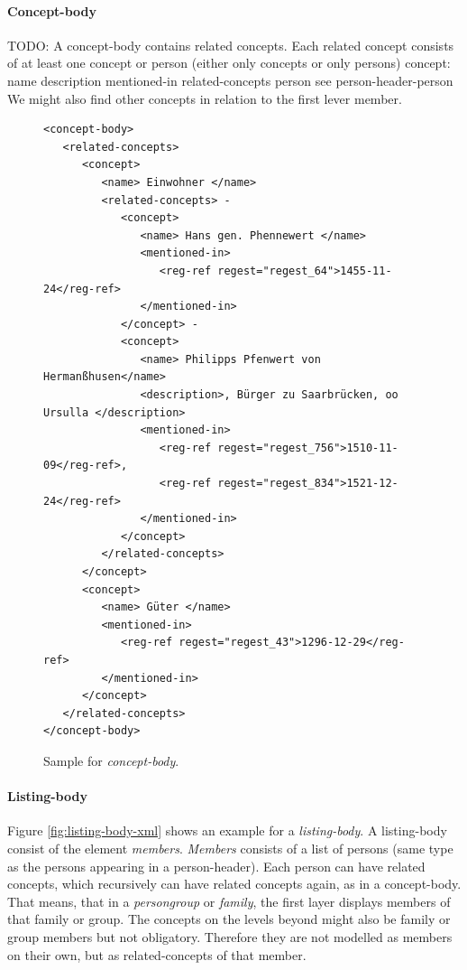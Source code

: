 \paragraph{Concept-body}
TODO: A concept-body contains related concepts. Each related concept consists of at least one concept or person (either only concepts or only persons)
concept:
name
description
mentioned-in
related-concepts
person
see person-header-person
We might also find other concepts in relation to the first lever member.
\begin{figure}[H]
\begin{verbatim}
<concept-body>
   <related-concepts>
      <concept>
         <name> Einwohner </name>
         <related-concepts> -
            <concept>
               <name> Hans gen. Phennewert </name>
               <mentioned-in>
                  <reg-ref regest="regest_64">1455-11-24</reg-ref>
               </mentioned-in>
            </concept> -
            <concept>
               <name> Philipps Pfenwert von Hermanßhusen</name>
               <description>, Bürger zu Saarbrücken, oo Ursulla </description>
               <mentioned-in>
                  <reg-ref regest="regest_756">1510-11-09</reg-ref>, 
                  <reg-ref regest="regest_834">1521-12-24</reg-ref>
               </mentioned-in>
            </concept>
         </related-concepts>
      </concept>
      <concept>
         <name> Güter </name>
         <mentioned-in>
            <reg-ref regest="regest_43">1296-12-29</reg-ref>
         </mentioned-in>
      </concept>
   </related-concepts>
</concept-body>
\end{verbatim}
\label{fig:concept-body-xml}
\caption{Sample for \textit{concept-body}.}
\end{figure}

\paragraph{Listing-body}
Figure \ref{fig:listing-body-xml} shows an example for a \textit{listing-body}. A listing-body consist of the element \textit{members}. \textit{Members} consists of a list of persons (same type as the persons appearing in a person-header). Each person can have related concepts, which recursively can have related concepts again, as in a concept-body.
That means, that in a \textit{persongroup} or \textit{family}, the first layer displays members of that family or group. The concepts on the levels beyond might also be family or group members but not obligatory. Therefore they are not modelled as members on their own, but as related-concepts of that member.

